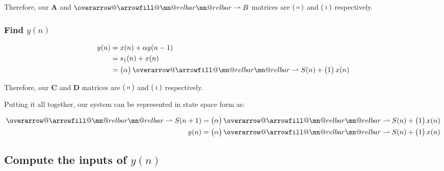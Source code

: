 \documentclass{article}
\makeatletter
\renewcommand{\thesubsection}{\thesection.\alph{subsection}}
\renewcommand{\thesubsubsection}{\thesection.\alph{subsection}.\Roman{subsubsection}}
\DeclareRobustCommand{\overrightharpoon}{\mathpalette{\overarrow@\rightharpoonfill@}}
\def\rightharpoonfill@{\arrowfill@\mn@relbar\mn@relbar\rightharpoonup}
\makeatother
\begin{document}
Therefore, our $\boldsymbol{A}$ and $\overrightharpoon{B}$ matrices are $\begin{psmallmatrix} \alpha \end{psmallmatrix}$ and $\begin{psmallmatrix} 1 \end{psmallmatrix}$ respectively.

\subsubsection[~\thesubsubsection]{Find $y(n)$}

\begin{align*}
	y(n) &= x(n) + {\alpha}y(n - 1) \\
	&= s_1(n) + x(n) \\
	&= \begin{pmatrix} \alpha \end{pmatrix}\overrightharpoon{S(n)} + \begin{pmatrix} 1 \end{pmatrix}x(n)
\end{align*}

Therefore, our $\boldsymbol{C}$ and $\boldsymbol{D}$ matrices are $\begin{psmallmatrix} \alpha \end{psmallmatrix}$ and $\begin{psmallmatrix} 1 \end{psmallmatrix}$ respectively.

Putting it all together, our system can be represented in state space form as:

\begin{align*}
	\overrightharpoon{S(n + 1)}&= \begin{pmatrix} \alpha \end{pmatrix}\overrightharpoon{S(n)} + \begin{pmatrix} 1 \end{pmatrix}x(n) \\
	y(n) &= \begin{pmatrix} \alpha \end{pmatrix}\overrightharpoon{S(n)} + \begin{pmatrix} 1 \end{pmatrix}x(n)
\end{align*}

\subsection[~\thesubsection]{Compute the inputs of $y(n)$}
\end{document}
